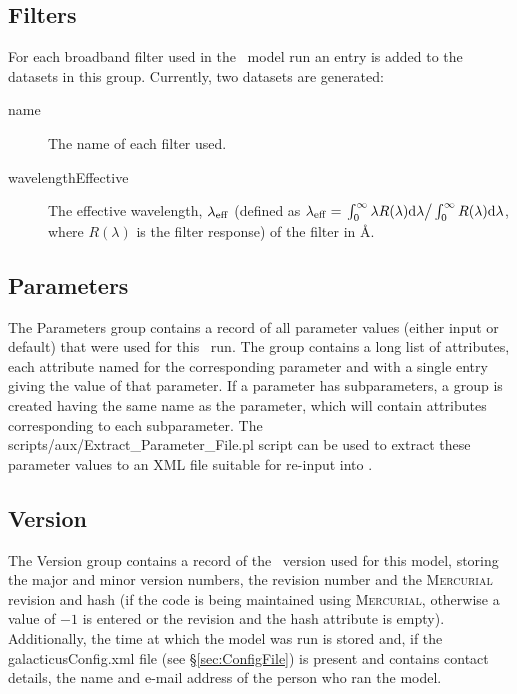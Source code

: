 \subsection{Filters}

For each broadband filter used in the \glc\ model run an entry is added to the datasets in this group. Currently, two datasets are generated:
\begin{description}
\item[{\normalfont \ttfamily name}] The name of each filter used.
\item[{\normalfont \ttfamily wavelengthEffective}] The effective wavelength, $\lambda_{\rm eff}$ (defined as $\lambda_{\rm eff}=\left. \int_0^\infty \lambda R(\lambda) {\rm d}\lambda \right/ \int_0^\infty R(\lambda) {\rm d}\lambda$, where $R(\lambda)$ is the filter response) of the filter in \AA.
\end{description}

\subsection{Parameters}

The {\normalfont \ttfamily Parameters} group contains a record of all parameter values (either input or default) that were used for this \glc\ run. The group contains a long list of attributes, each attribute named for the corresponding parameter and with a single entry giving the value of that parameter. If a parameter has subparameters, a group is created having the same name as the parameter, which will contain attributes corresponding to each subparameter. The {\normalfont \ttfamily scripts/aux/Extract\_Parameter\_File.pl} script can be used to extract these parameter values to an XML file suitable for re-input into \glc.

\subsection{Version}

The {\normalfont \ttfamily Version} group contains a record of the \glc\ version used for this model, storing the major and minor version numbers, the revision number and the {\normalfont \scshape Mercurial} revision and hash (if the code is being maintained using {\normalfont \scshape Mercurial}, otherwise a value of $-1$ is entered or the revision and the hash attribute is empty). Additionally, the time at which the model was run is stored and, if the {\normalfont \ttfamily galacticusConfig.xml} file (see \S\ref{sec:ConfigFile}) is present and contains contact details, the name and e-mail address of the person who ran the model.

